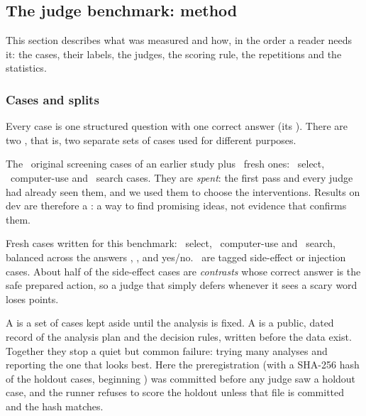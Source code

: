 \subsection{The judge benchmark: method}\label{jb:sec:method}

This section describes what was measured and how, in the order a reader needs it: the cases, their
labels, the judges, the scoring rule, the repetitions and the statistics.

\subsubsection{Cases and splits}

Every case is one structured question with one correct answer (its ). There are two
, that is, two separate sets of cases used for different purposes.

\begin{description}[leftmargin=1.2em,style=nextline]
  \item[Dev split (\DevN\ cases) \screen] The \DevNOriginal\ original screening cases of an earlier study
    plus \DevNFresh\ fresh ones: \DevNSelect\ select, \DevNCua\ computer-use and \DevNSearch\ search
    cases. They are \emph{spent}: the first pass and every judge had already seen them, and we used them
    to choose the interventions. Results on dev are therefore a : a way to find promising
    ideas, not evidence that confirms them.
  \item[Holdout split (\HoldN\ cases) \prereg] Fresh cases written for this benchmark:
    \HoldNSelect\ select, \HoldNCua\ computer-use and \HoldNSearch\ search, balanced across the answers
    , ,  and yes/no. \HoldNSideOrInjection\ are tagged side-effect or
    injection cases. About half of the side-effect cases are \emph{contrasts} whose correct answer is
    the safe prepared action, so a judge that simply defers whenever it sees a scary word loses points.
\end{description}

\begin{keyidea}
A  is a set of cases kept aside until the analysis is fixed. A 
is a public, dated record of the analysis plan and the decision rules, written before the data exist.
Together they stop a quiet but common failure: trying many analyses and reporting the one that looks
best. Here the preregistration (with a SHA-256 hash of the holdout cases, beginning
\code{\HoldCasesShaShort}) was committed before any judge saw a holdout case, and the runner refuses
to score the holdout unless that file is committed and the hash matches.
\end{keyidea}


